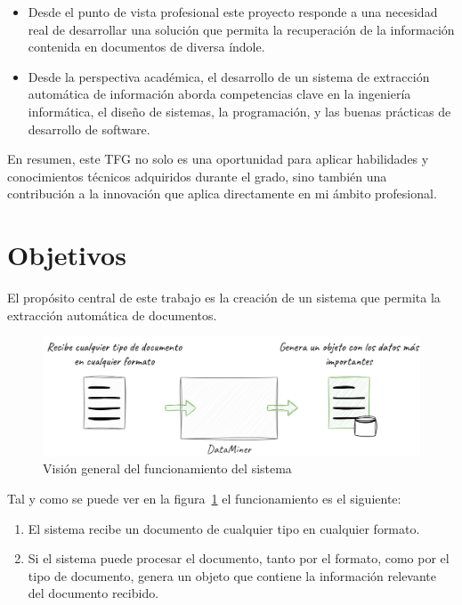 \begin{itemize}
    \item
    Desde el punto de vista profesional este proyecto responde a una necesidad real de desarrollar una solución
    que permita la recuperación de la información contenida en documentos de diversa índole.
    \item
    Desde la perspectiva académica, el desarrollo de un sistema de extracción automática de información aborda
    competencias clave en la ingeniería informática, el diseño de sistemas, la programación, y las buenas prácticas de
    desarrollo de software.
\end{itemize}

En resumen, este TFG no solo es una oportunidad para aplicar habilidades y conocimientos técnicos adquiridos durante el
grado, sino también una contribución a la innovación que aplica directamente en mi ámbito profesional.


\section{Objetivos}

El propósito central de este trabajo es la creación de un sistema que permita la extracción automática de documentos.

\begin{figure}[ht]
    \begin{center}
        \includegraphics[width=\textwidth]{./chapter/1/images/chapter_1.overview}
        \caption{Visión general del funcionamiento del sistema}
        \label{fig:chapter_1.overview}
    \end{center}
\end{figure}

Tal y como se puede ver en la figura~\ref{fig:chapter_1.overview} el funcionamiento es el siguiente:

\begin{enumerate}
    \item El sistema recibe un documento de cualquier tipo en cualquier formato.
    \item
    Si el sistema puede procesar el documento, tanto por el formato, como por el tipo de documento, genera un objeto que
    contiene la información relevante del documento recibido.
\end{enumerate}


